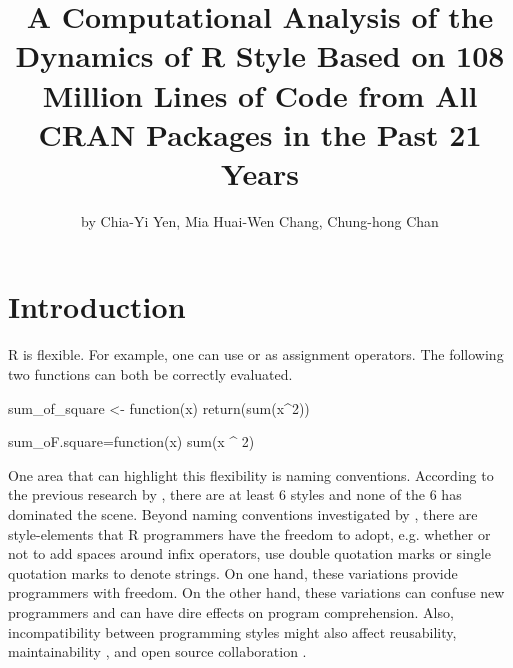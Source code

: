 \title{A Computational Analysis of the Dynamics of R Style Based on 108 Million Lines of Code from All CRAN Packages in the Past 21 Years}
\author{by Chia-Yi Yen, Mia Huai-Wen Chang, Chung-hong Chan}

\maketitle


\section{Introduction}

R is flexible. For example, one can use \code{<-} or \code{=} as assignment operators. The following two functions can both be correctly evaluated.

\begin{example}
sum_of_square <- function(x) {
    return(sum(x^2))
}
\end{example}

\begin{example}
sum_oF.square=function(x)
{
    sum(x ^ 2)}
\end{example}

One area that can highlight this flexibility is naming conventions. According to the previous research by \citet{baaaath}, there are at least 6 styles and none of the 6 has dominated the scene. Beyond naming conventions investigated by \citet{baaaath}, there are style-elements that R programmers have the freedom to adopt, e.g. whether or not to add spaces around infix operators, use double quotation marks or single quotation marks to denote strings. On one hand, these variations provide programmers with freedom. On the other hand, these variations can confuse new programmers and can have dire effects on program comprehension. Also, incompatibility between programming styles might also affect reusability, maintainability \citep{elish}, and open source collaboration \citep{wang}. 

